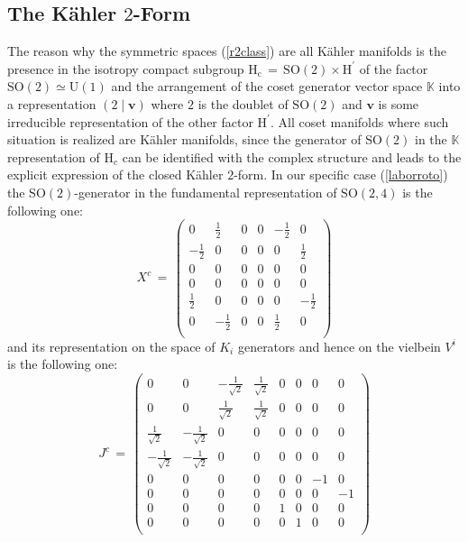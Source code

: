 \documentclass[10pt,a4paper]{article}
\begin{document}
\subsection{The K\"ahler $2$-Form}
The reason why the symmetric spaces (\ref{r2class}) are all K\"ahler manifolds is the presence in the isotropy compact subgroup
$\mathrm{H_c }\, = \, \mathrm{SO(2) \times H^\prime}$ of the factor $\mathrm{SO(2)} \simeq \mathrm{U(1)}$ and the arrangement of the coset generator vector space $\mathbb{K}$ into a representation $(2\mid \mathbf{v})$ where $2$ is the doublet of $\mathrm{SO(2)}$ and  $\mathbf{v}$ is some irreducible representation of the other factor $ \mathrm{H^\prime}$. All coset manifolds where such situation is realized are K\"ahler manifolds, since the generator of $\mathrm{SO(2)}$ in the $\mathbb{K}$ representation of $\mathrm{H}_c$ can be identified with the complex structure and leads to the explicit expression of the closed K\"ahler $2$-form. In our specific case (\ref{laborroto}) the $\mathrm{SO(2)}$-generator in the fundamental representation of $\mathrm{SO(2,4)}$ is the following one:
\begin{equation}\label{Xci}
  X^c \, = \, \left(
\begin{array}{cccccc}
 0 & \frac{1}{2} & 0 & 0 & -\frac{1}{2} & 0 \\
 -\frac{1}{2} & 0 & 0 & 0 & 0 & \frac{1}{2} \\
 0 & 0 & 0 & 0 & 0 & 0 \\
 0 & 0 & 0 & 0 & 0 & 0 \\
 \frac{1}{2} & 0 & 0 & 0 & 0 & -\frac{1}{2} \\
 0 & -\frac{1}{2} & 0 & 0 & \frac{1}{2} & 0 \\
\end{array}
\right)
\end{equation}
and its representation on the space of $K_i$ generators and hence on the vielbein $V^i$ is the following one:
\begin{equation}\label{XcOnK}
 J^c \, =\, \left(
\begin{array}{cccccccc}
 0 & 0 & -\frac{1}{\sqrt{2}} & \frac{1}{\sqrt{2}} & 0 & 0 & 0 & 0 \\
 0 & 0 & \frac{1}{\sqrt{2}} & \frac{1}{\sqrt{2}} & 0 & 0 & 0 & 0 \\
 \frac{1}{\sqrt{2}} & -\frac{1}{\sqrt{2}} & 0 & 0 & 0 & 0 & 0 & 0 \\
 -\frac{1}{\sqrt{2}} & -\frac{1}{\sqrt{2}} & 0 & 0 & 0 & 0 & 0 & 0 \\
 0 & 0 & 0 & 0 & 0 & 0 & -1 & 0 \\
 0 & 0 & 0 & 0 & 0 & 0 & 0 & -1 \\
 0 & 0 & 0 & 0 & 1 & 0 & 0 & 0 \\
 0 & 0 & 0 & 0 & 0 & 1 & 0 & 0 \\
\end{array}
\right)
\end{equation}
\end{document}
